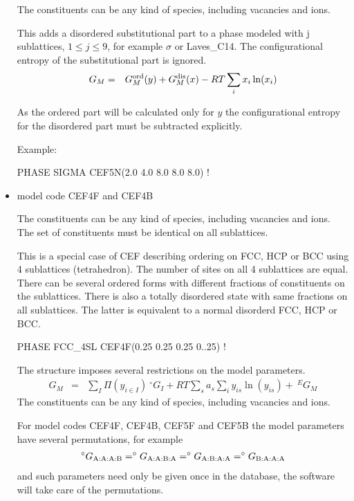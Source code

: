 \documentclass[12pt]{article}
\begin{document}
\begin{itemize}
  The constituents can be any kind of species, including vacancies and
  ions.

  This adds a disordered substitutional part to a phase modeled with j
  sublattices, $1\leq j \leq 9$, for example $\sigma$ or Laves\_C14.
  The configurational entropy of the substitutional part is
  ignored.
  \begin{eqnarray}
    G_M &=& G_M^{\rm ord}(y) + G_M^{\rm dis}(x) - RT\sum_i x_i\ln(x_i)
  \end{eqnarray}

  As the ordered part will be calculated only for $y$ the
  configurational entropy for the disordered part must be subtracted
  explicitly.

  Example:

  PHASE SIGMA CEF5N(2.0 4.0 8.0 8.0 8.0) !
  
\item model code CEF4F and CEF4B 

  The constituents can be any kind of species, including vacancies and
  ions.  The set of constituents must be identical on all sublattices.

  This is a special case of CEF describing ordering on FCC, HCP or BCC
  using 4 sublattices (tetrahedron).  The number of sites on all 4
  sublattices are equal.  There can be several ordered forms with
  different fractions of constituents on the sublattices.  There is
  also a totally disordered state with same fractions on all
  sublattices.  The latter is equivalent to a normal disorderd FCC,
  HCP or BCC.

  PHASE FCC\_4SL CEF4F(0.25 0.25 0.25 0..25) !

  The structure imposes several restrictions on the model parameters.
  \begin{eqnarray}
    G_M &=& \sum_I \Pi(y_{i\in I}) ~^{\circ}G_I + RT \sum_s a_s \sum_i y_{is}\ln(y_{is}) + ~^EG_M
  \end{eqnarray}
  The constituents can be any kind of species, including vacancies and
  ions.

  For model codes CEF4F, CEF4B, CEF5F and CEF5B the model parameters
  have several permutations, for example
  \begin{eqnarray}
    ^{\circ}G_{\rm A:A:A:B}=^{\circ}G_{\rm A:A:B:A}=^{\circ}G_{\rm A:B:A:A}=^{\circ}G_{\rm B:A:A:A}
  \end{eqnarray}
  and such parameters need only be given once in the database, the
  software will take care of the permutations.


\end{itemize}
\end{document}
